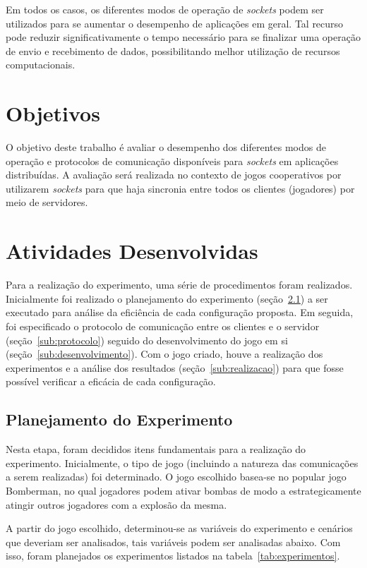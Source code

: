 \documentclass[12pt]{article}
\begin{document}
Em todos os casos, os diferentes modos de operação de \emph{sockets} podem ser utilizados para se aumentar o desempenho de aplicações em geral. Tal recurso pode reduzir significativamente o tempo necessário para se finalizar uma operação de envio e recebimento de dados, possibilitando melhor utilização de recursos computacionais.

\section{Objetivos} \label{sec:objetivos}

O objetivo deste trabalho é avaliar o desempenho dos diferentes modos de
operação e protocolos de comunicação disponíveis para \emph{sockets} em
aplicações distribuídas. A avaliação será realizada no contexto de jogos
cooperativos por utilizarem \emph{sockets} para que haja sincronia entre todos
os clientes (jogadores) por meio de servidores.

\section{Atividades Desenvolvidas} \label{sec:atividades}

Para a realização do experimento, uma série de procedimentos foram realizados.
Inicialmente foi realizado o planejamento do experimento
(seção~\ref{sub:planejamento}) a ser executado para análise da eficiência de
cada configuração proposta. Em seguida, foi especificado o protocolo de
comunicação entre os clientes e o servidor (seção~\ref{sub:protocolo}) seguido
do desenvolvimento do jogo em si (seção~\ref{sub:desenvolvimento}). Com o jogo
criado, houve a realização dos experimentos e a análise dos resultados
(seção~\ref{sub:realizacao}) para que fosse possível verificar a eficácia de
cada configuração.

\subsection{Planejamento do Experimento} \label{sub:planejamento}

Nesta etapa, foram decididos itens fundamentais para a realização do
experimento. Inicialmente, o tipo de jogo (incluindo a natureza das
comunicações a serem realizadas) foi determinado. O jogo escolhido basea-se no
popular jogo Bomberman, no qual jogadores podem ativar bombas de modo a
estrategicamente atingir outros jogadores com a explosão da mesma.

A partir do jogo escolhido, determinou-se as variáveis do experimento e
cenários que deveriam ser analisados, tais variáveis podem ser analisadas
abaixo. Com isso, foram planejados os experimentos listados na tabela~\ref{tab:experimentos}.
\end{document}
